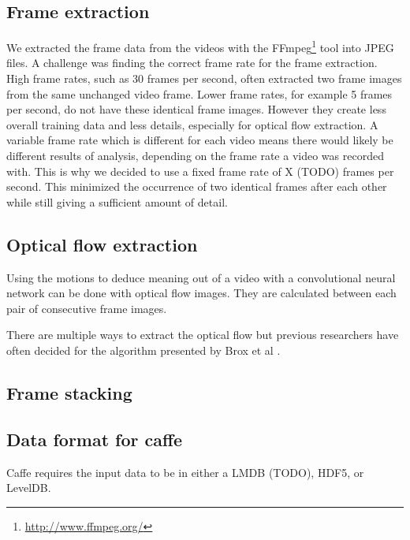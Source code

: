 
\subsection{Frame extraction}
We extracted the frame data from the videos with the FFmpeg\footnote{\url{http://www.ffmpeg.org/}} tool into JPEG files.
A challenge was finding the correct frame rate for the frame extraction.
High frame rates, such as 30 frames per second, often extracted two frame images from the same unchanged video frame.
Lower frame rates, for example 5 frames per second, do not have these identical frame images.
However they create less overall training data and less details, especially for optical flow extraction.
A variable frame rate which is different for each video means there would likely be different results of analysis, depending on the frame rate a video was recorded with.
This is why we decided to use a fixed frame rate of X (TODO) frames per second.
This minimized the occurrence of two identical frames after each other while still giving a sufficient amount of detail.

\subsection{Optical flow extraction}
Using the motions to deduce meaning out of a video with a convolutional neural network can be done with optical flow images.
They are calculated between each pair of consecutive frame images.

There are multiple ways to extract the optical flow but previous researchers  have often decided for the algorithm presented by Brox et al
\cite{brox2004high}.



\subsection{Frame stacking}


\subsection{Data format for caffe}
Caffe requires the input data to be in either a LMDB (TODO), HDF5, or LevelDB.

